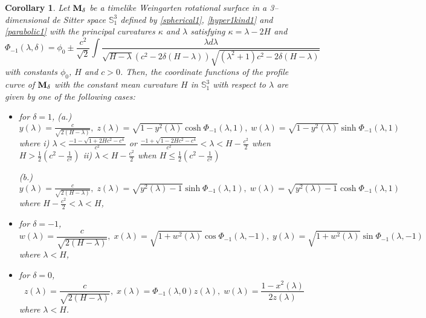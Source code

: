 \documentclass{amsart}
\newtheorem{Corollary}[Theorem]{Corollary}
\theoremstyle{definition}
\numberwithin{equation}{section}
\begin{document}
\begin{Corollary}
\label{timelikeWeingarten}
Let ${\bf M}_\delta$ be a timelike Weingarten rotational surface in a 3--dimensional de Sitter space $\mathbb{S}^3_1$
defined by \eqref{spherical1}, \eqref{hyper1kind1} and \eqref{parabolic1} 
with the principal curvatures $\kappa$ and $\lambda$
satisfying $\kappa=\lambda-2H$ and 
\begin{equation}
        \Phi_{-1}(\lambda,\delta)=\phi_0\pm\frac{c^2}{\sqrt{2}}\int{\frac{\lambda d\lambda}{\sqrt{H-\lambda}(c^2-2\delta(H-\lambda))\sqrt{(\lambda^2+1)c^2-2\delta(H-\lambda)}}}
    \end{equation}
with constants $\phi_0$, $H$ and $c>0$. 
Then, the coordinate functions of the profile curve of ${\bf M}_\delta$ with the constant mean curvature $H$ in $\mathbb{S}^3_1$ with respect to $\lambda$
are given by one of the following cases:
\begin{itemize}
    \item [1.] for $\delta=1$,
    \subitem (a.) $y(\lambda)=\frac{c}{\sqrt{2(H-\lambda)}},\; z(\lambda)=\sqrt{1-y^2(\lambda)}
    \cosh{\Phi_{-1}(\lambda,1)},\; w(\lambda)=\sqrt{1-y^2(\lambda)}
    \sinh{\Phi_{-1}(\lambda,1)}$
    where
    \subsubitem i) $\lambda<\frac{-1-\sqrt{1+2Hc^2-c^4}}{c^2}$ or 
    $\frac{-1+\sqrt{1-2Hc^2-c^4}}{c^2}<
    \lambda<H-\frac{c^2}{2}$ when $H>\frac{1}{2}\left(c^2-\frac{1}{c^2}\right)$
    \subsubitem ii) 
    $\lambda<H-\frac{c^2}{2}$ when $H\leq\frac{1}{2}\left(c^2-\frac{1}{c^2}\right)$

    \subitem (b.) $y(\lambda)=\frac{c}{\sqrt{2(H-\lambda)}},\; z(\lambda)=\sqrt{y^2(\lambda)-1}
    \sinh{\Phi_{-1}(\lambda,1)},\; w(\lambda)=\sqrt{y^2(\lambda)-1}
    \cosh{\Phi_{-1}(\lambda,1)}$
    where $H-\frac{c^2}{2}<\lambda<H$,
    
    \item [2.] for $\delta=-1$, 
    $$w(\lambda)=\frac{c}{\sqrt{2(H-\lambda)}},\; x(\lambda)=\sqrt{1+w^2(\lambda)}
    \cos{\Phi_{-1}(\lambda,-1)},\; y(\lambda)=\sqrt{1+w^2(\lambda)}
    \sin{\Phi_{-1}(\lambda,-1)}$$
    where $\lambda<H$,
    
    \item [3.] for $\delta=0$,
    $$z(\lambda)=\frac{c}{\sqrt{2(H-\lambda)}},\; x(\lambda)=\Phi_{-1}(\lambda,0)z(\lambda),\; w(\lambda)=\frac{1-x^2(\lambda)}{2z(\lambda)}$$
    where $\lambda<H$.  
\end{itemize}
\end{Corollary}
\end{document}

